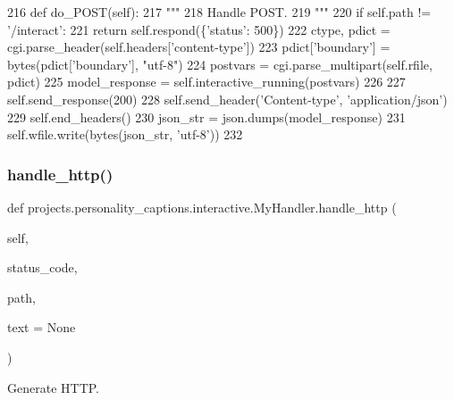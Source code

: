\begin{DoxyCode}
216     \textcolor{keyword}{def }do\_POST(self):
217         \textcolor{stringliteral}{"""}
218 \textcolor{stringliteral}{        Handle POST.}
219 \textcolor{stringliteral}{        """}
220         \textcolor{keywordflow}{if} self.path != \textcolor{stringliteral}{'/interact'}:
221             \textcolor{keywordflow}{return} self.respond(\{\textcolor{stringliteral}{'status'}: 500\})
222         ctype, pdict = cgi.parse\_header(self.headers[\textcolor{stringliteral}{'content-type'}])
223         pdict[\textcolor{stringliteral}{'boundary'}] = bytes(pdict[\textcolor{stringliteral}{'boundary'}], \textcolor{stringliteral}{"utf-8"})
224         postvars = cgi.parse\_multipart(self.rfile, pdict)
225         model\_response = self.interactive\_running(postvars)
226 
227         self.send\_response(200)
228         self.send\_header(\textcolor{stringliteral}{'Content-type'}, \textcolor{stringliteral}{'application/json'})
229         self.end\_headers()
230         json\_str = json.dumps(model\_response)
231         self.wfile.write(bytes(json\_str, \textcolor{stringliteral}{'utf-8'}))
232 
\end{DoxyCode}
\mbox{\label{classprojects_1_1personality__captions_1_1interactive_1_1MyHandler_aa0900ea1f19ecd9cd9bf0ae93ce1028e}} 
\subsubsection{\texorpdfstring{handle\+\_\+http()}{handle\_http()}}
{\footnotesize\ttfamily def projects.\+personality\+\_\+captions.\+interactive.\+My\+Handler.\+handle\+\_\+http (\begin{DoxyParamCaption}\item[{}]{self,  }\item[{}]{status\+\_\+code,  }\item[{}]{path,  }\item[{}]{text = {\ttfamily None} }\end{DoxyParamCaption})}

\begin{DoxyVerb}Generate HTTP.
\end{DoxyVerb}
 

